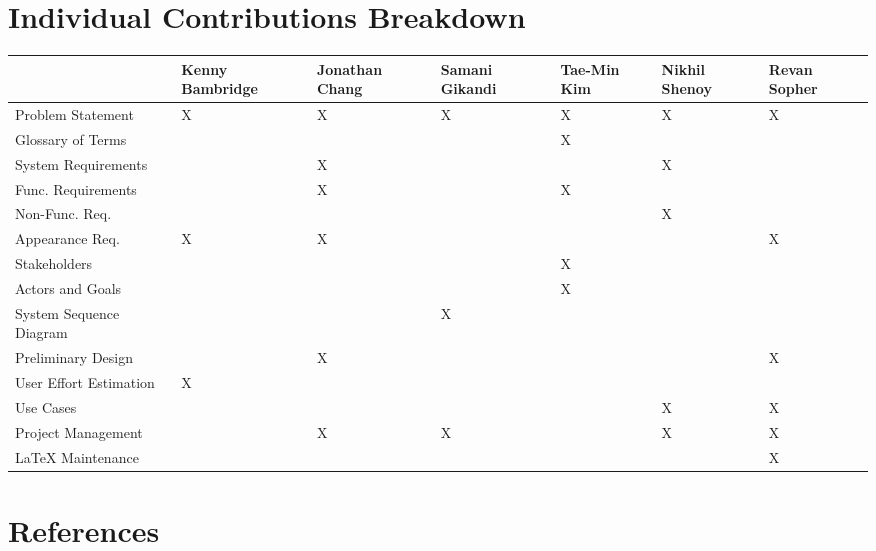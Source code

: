 \documentclass[letterpaper,english, 12pt]{scrreprt}
\begin{document}
\chapter*{Individual Contributions Breakdown}
\begin{center}
	\begin{tabular}{|l|C{2cm}|C{1.5cm}|C{1.5cm}|C{1.5cm}|C{1.5cm}|C{1.5cm}|}
		\hline
								&Kenny Bambridge&Jonathan Chang	&Samani Gikandi	&Tae-Min Kim&Nikhil Shenoy	&Revan Sopher\\ \hline
			Problem Statement	&		X		&		X		&		X		&		X	&		X		&		X\\ \hline
			Glossary of Terms	&				&				&				&		X	&				&		\\ \hline
			System Requirements	&				&		X		&				&			&		X		&		\\ \hline
			Func. Requirements	&				&		X		&				&		X	&				&		\\ \hline
			Non-Func. Req.		&				&				&				&			&		X		&		\\ \hline
			Appearance Req.		&		X		&		X		&				&			&				&		X\\ \hline
			Stakeholders		&				&				&				&		X	&				&		 \\ \hline
			Actors and Goals	&				&				&				&		X	&				&		 \\ \hline
			System Sequence Diagram &				&				&		X		&			&				&		 \\ \hline
			Preliminary Design	&				&		X		&				&			&				&	X	 \\ \hline
			User Effort Estimation  &		X		&				&				&			&				&		 \\ \hline
			Use Cases		&				&				&				&			&		X		&	X	 \\ \hline
			Project Management	&				&		X		&		X		&			&		X		&		X\\ \hline
            LaTeX Maintenance	&				&				&				&			&				&		X\\ \hline
	\end{tabular}
\end{center}

\chapter*{References}
\end{document}
